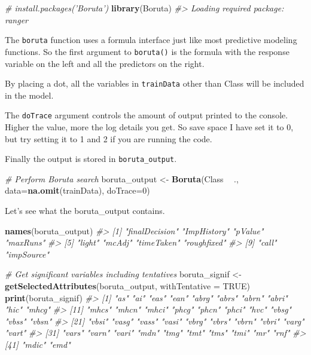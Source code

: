 \documentclass[]{book}
\newenvironment{Shaded}{\begin{snugshade}}{\end{snugshade}}
\newcommand{\CommentTok}[1]{\textcolor[rgb]{0.56,0.35,0.01}{\textit{#1}}}
\newcommand{\DataTypeTok}[1]{\textcolor[rgb]{0.13,0.29,0.53}{#1}}
\newcommand{\DecValTok}[1]{\textcolor[rgb]{0.00,0.00,0.81}{#1}}
\newcommand{\KeywordTok}[1]{\textcolor[rgb]{0.13,0.29,0.53}{\textbf{#1}}}
\newcommand{\NormalTok}[1]{#1}
\newcommand{\OperatorTok}[1]{\textcolor[rgb]{0.81,0.36,0.00}{\textbf{#1}}}
\newcommand{\OtherTok}[1]{\textcolor[rgb]{0.56,0.35,0.01}{#1}}
\newcommand{\StringTok}[1]{\textcolor[rgb]{0.31,0.60,0.02}{#1}}
\begin{document}
\begin{Shaded}
\begin{Highlighting}[]
\CommentTok{# install.packages('Boruta')}
\KeywordTok{library}\NormalTok{(Boruta)}
\CommentTok{#> Loading required package: ranger}
\end{Highlighting}
\end{Shaded}

The \texttt{boruta} function uses a formula interface just like most predictive modeling functions. So the first argument to \texttt{boruta()} is the formula with the response variable on the left and all the predictors on the right.

By placing a dot, all the variables in \texttt{trainData} other than Class will be included in the model.

The \texttt{doTrace} argument controls the amount of output printed to the console. Higher the value, more the log details you get. So save space I have set it to 0, but try setting it to 1 and 2 if you are running the code.

Finally the output is stored in \texttt{boruta\_output}.

\begin{Shaded}
\begin{Highlighting}[]
\CommentTok{# Perform Boruta search}
\NormalTok{boruta_output <-}\StringTok{ }\KeywordTok{Boruta}\NormalTok{(Class }\OperatorTok{~}\StringTok{ }\NormalTok{., }\DataTypeTok{data=}\KeywordTok{na.omit}\NormalTok{(trainData), }\DataTypeTok{doTrace=}\DecValTok{0}\NormalTok{)  }
\end{Highlighting}
\end{Shaded}

Let's see what the boruta\_output contains.

\begin{Shaded}
\begin{Highlighting}[]
\KeywordTok{names}\NormalTok{(boruta_output)}
\CommentTok{#>  [1] "finalDecision" "ImpHistory"    "pValue"        "maxRuns"      }
\CommentTok{#>  [5] "light"         "mcAdj"         "timeTaken"     "roughfixed"   }
\CommentTok{#>  [9] "call"          "impSource"}
\end{Highlighting}
\end{Shaded}

\begin{Shaded}
\begin{Highlighting}[]
\CommentTok{# Get significant variables including tentatives}
\NormalTok{boruta_signif <-}\StringTok{ }\KeywordTok{getSelectedAttributes}\NormalTok{(boruta_output, }\DataTypeTok{withTentative =} \OtherTok{TRUE}\NormalTok{)}
\KeywordTok{print}\NormalTok{(boruta_signif)  }
\CommentTok{#>  [1] "as"   "ai"   "eas"  "ean"  "abrg" "abrs" "abrn" "abri" "hic"  "mhcg"}
\CommentTok{#> [11] "mhcs" "mhcn" "mhci" "phcg" "phcn" "phci" "hvc"  "vbsg" "vbss" "vbsn"}
\CommentTok{#> [21] "vbsi" "vasg" "vass" "vasi" "vbrg" "vbrs" "vbrn" "vbri" "varg" "vart"}
\CommentTok{#> [31] "vars" "varn" "vari" "mdn"  "tmg"  "tmt"  "tms"  "tmi"  "mr"   "rnf" }
\CommentTok{#> [41] "mdic" "emd"}
\end{Highlighting}
\end{Shaded}
\end{document}
